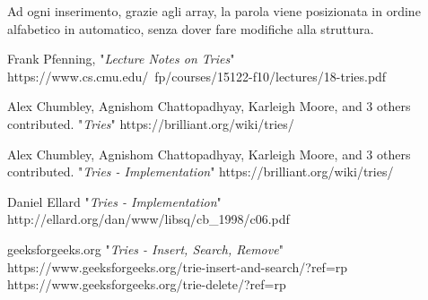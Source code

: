 \documentclass[a4paper, 12pt]{article}
\begin{document}
Ad ogni inserimento, grazie agli array, la parola viene posizionata in ordine alfabetico in automatico, senza dover fare modifiche alla struttura.

\clearpage

\begin{thebibliography}{}
  Frank Pfenning, 
                            "\emph{Lecture Notes on Tries}"
                             https://www.cs.cmu.edu/~fp/courses/15122-f10/lectures/18-tries.pdf

      Alex Chumbley, Agnishom Chattopadhyay, Karleigh Moore, and 3 others contributed.
                            "\emph{Tries}"
                            https://brilliant.org/wiki/tries/
                            
            Alex Chumbley, Agnishom Chattopadhyay, Karleigh Moore, and 3 others contributed.
                            "\emph{Tries - Implementation}"
                             https://brilliant.org/wiki/tries/
                             
            Daniel Ellard
                            "\emph{Tries - Implementation}"
                             http://ellard.org/dan/www/libsq/cb\_1998/c06.pdf
                             
            geeksforgeeks.org
                            "\emph{Tries - Insert, Search, Remove}"
                             https://www.geeksforgeeks.org/trie-insert-and-search/?ref=rp
                             https://www.geeksforgeeks.org/trie-delete/?ref=rp
\end{thebibliography}
\end{document}
